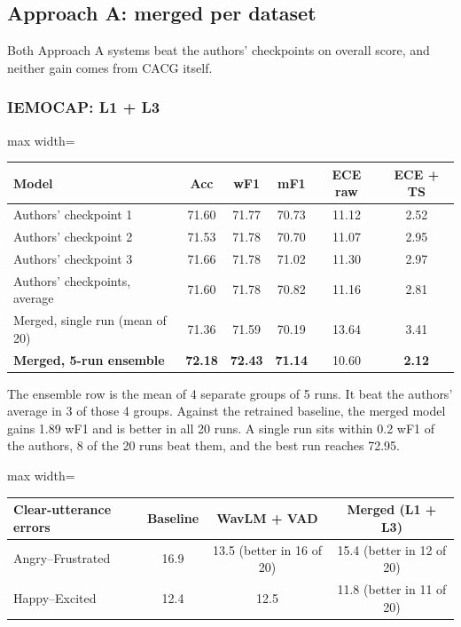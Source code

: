 \documentclass[11pt,a4paper]{article}
\begin{document}
\subsection{Approach A: merged per dataset}

Both Approach A systems beat the authors' checkpoints on overall score, and neither gain comes from CACG itself.

\subsubsection{IEMOCAP: L1 + L3}

\begin{center}
\begin{adjustbox}{max width=\linewidth}
\begin{tabular}{lccccc}
\toprule
Model & Acc & wF1 & mF1 & ECE raw & ECE + TS \\
\midrule
Authors' checkpoint 1 & 71.60 & 71.77 & 70.73 & 11.12 & 2.52 \\
Authors' checkpoint 2 & 71.53 & 71.78 & 70.70 & 11.07 & 2.95 \\
Authors' checkpoint 3 & 71.66 & 71.78 & 71.02 & 11.30 & 2.97 \\
Authors' checkpoints, average & 71.60 & 71.78 & 70.82 & 11.16 & 2.81 \\
Merged, single run (mean of 20) & 71.36 & 71.59 & 70.19 & 13.64 & 3.41 \\
\textbf{Merged, 5-run ensemble} & \textbf{72.18} & \textbf{72.43} & \textbf{71.14} & 10.60 & \textbf{2.12} \\
\bottomrule
\end{tabular}
\end{adjustbox}
\end{center}

The ensemble row is the mean of 4 separate groups of 5 runs. It beat the authors' average in 3 of those 4 groups. Against the retrained baseline, the merged model gains 1.89 wF1 and is better in all 20 runs. A single run sits within 0.2 wF1 of the authors, 8 of the 20 runs beat them, and the best run reaches 72.95.

\begin{center}
\begin{adjustbox}{max width=\linewidth}
\begin{tabular}{lccc}
\toprule
Clear-utterance errors & Baseline & WavLM + VAD & Merged (L1 + L3) \\
\midrule
Angry--Frustrated & 16.9 & 13.5 (better in 16 of 20) & 15.4 (better in 12 of 20) \\
Happy--Excited & 12.4 & 12.5 & 11.8 (better in 11 of 20) \\
\bottomrule
\end{tabular}
\end{adjustbox}
\end{center}
\end{document}
